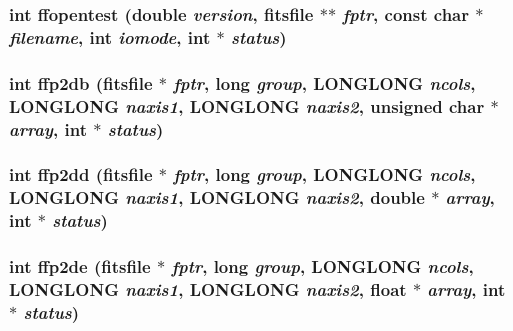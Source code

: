 \subsubsection{\setlength{\rightskip}{0pt plus 5cm}int ffopentest (double {\em version}, \bf{fitsfile} $\ast$$\ast$ {\em fptr}, const char $\ast$ {\em filename}, int {\em iomode}, int $\ast$ {\em status})}\label{test_2roimasker_2fitsio_8h_9c71ba8e466791b2eac6de1ca9848f4c}


\subsubsection{\setlength{\rightskip}{0pt plus 5cm}int ffp2db (\bf{fitsfile} $\ast$ {\em fptr}, long {\em group}, \bf{LONGLONG} {\em ncols}, \bf{LONGLONG} {\em naxis1}, \bf{LONGLONG} {\em naxis2}, unsigned char $\ast$ {\em array}, int $\ast$ {\em status})}\label{test_2roimasker_2fitsio_8h_8e43e1cab4a5cdaa87d44ed10bd52298}


\subsubsection{\setlength{\rightskip}{0pt plus 5cm}int ffp2dd (\bf{fitsfile} $\ast$ {\em fptr}, long {\em group}, \bf{LONGLONG} {\em ncols}, \bf{LONGLONG} {\em naxis1}, \bf{LONGLONG} {\em naxis2}, double $\ast$ {\em array}, int $\ast$ {\em status})}\label{test_2roimasker_2fitsio_8h_8add04b815d7489f9beeb3dd43857843}


\subsubsection{\setlength{\rightskip}{0pt plus 5cm}int ffp2de (\bf{fitsfile} $\ast$ {\em fptr}, long {\em group}, \bf{LONGLONG} {\em ncols}, \bf{LONGLONG} {\em naxis1}, \bf{LONGLONG} {\em naxis2}, float $\ast$ {\em array}, int $\ast$ {\em status})}\label{test_2roimasker_2fitsio_8h_d22120fc89698ea1c5d54ec66c038dce}


